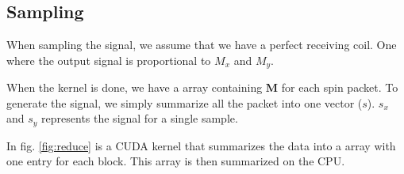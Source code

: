 






\subsection{Sampling}

When sampling the signal, we assume that we have a perfect receiving
coil. One where the output signal is proportional to $M_x$ and $M_y$.

When the kernel is done, we have a array containing $\textbf{M}$ for each spin
packet. To generate the signal, we simply summarize all the packet
into one vector ($s$). $s_x$ and $s_y$ represents the signal for a
single sample.

In fig. \ref{fig:reduce} is a CUDA kernel that summarizes the data into a array with one
entry for each block. This array is then summarized on the CPU.

